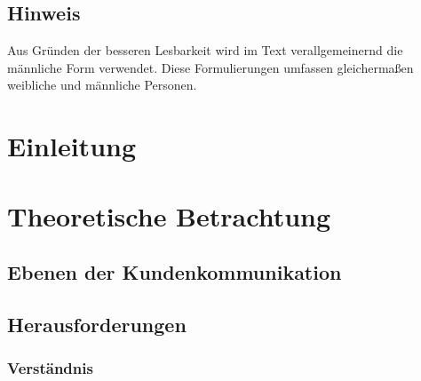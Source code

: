 \documentclass[
	12pt, %
	a4paper,
	bibliography=totoc, %
	numbers=noenddot, %
	ngerman, %
	headsepline, %
	oneside %
	]{scrbook} %
\begin{document}
\newpage

\tableofcontents{}

\listoffigures
{}

\section*{Hinweis}

Aus Gründen der besseren Lesbarkeit wird im Text verallgemeinernd die männliche Form verwendet.
Diese Formulierungen umfassen gleichermaßen weibliche und männliche Personen.
\clearpage




\printnoidxglossary{}
\printacronyms{}

\clearpage



\chapter{Einleitung}\label{ch:einleitung}


\chapter{Theoretische Betrachtung}\label{ch:theroy}


\section{Ebenen der Kundenkommunikation}\label{sec:ebenen}


\section{Herausforderungen}\label{sec:herausforderungen}


\subsection{Verständnis}\label{subsec:verstaendins}

\end{document}
